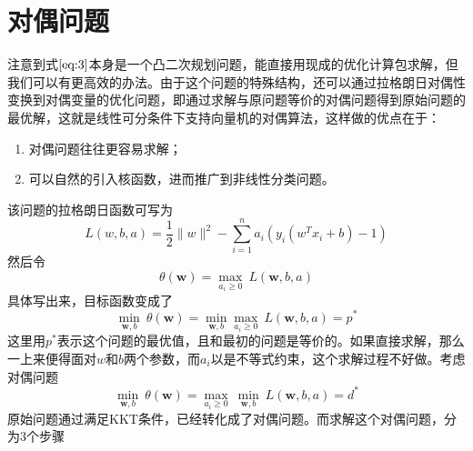 \section{对偶问题}
注意到式$\ref{eq:3}$本身是一个凸二次规划问题，能直接用现成的优化计算包求解，但我们可以有更高效的办法。由于这个问题的特殊结构，还可以通过拉格朗日对偶性变换到对偶变量的优化问题，即通过求解与原问题等价的对偶问题得到原始问题的最优解，这就是线性可分条件下支持向量机的对偶算法，这样做的优点在于：
\begin{enumerate}
	\item 对偶问题往往更容易求解；
	\item 可以自然的引入核函数，进而推广到非线性分类问题。	
\end{enumerate}
该问题的拉格朗日函数可写为
\begin{equation}
	L(w,b,a) = \frac{1}{2}\lVert w \rVert^2 - \sum_{i=1}^na_i (y_i(w^T x_i + b) - 1)
\end{equation}
然后令
\begin{equation}
	\theta (\boldsymbol{w}) = \mathop{max} \limits_{a_i \geq 0}\ L(\boldsymbol{w},b,a)
\end{equation}
具体写出来，目标函数变成了
\begin{equation}
	\mathop{min}\limits_{\boldsymbol{w},b}\ \theta(\boldsymbol{w}) = \mathop{min}\limits_{\boldsymbol{w},b}\mathop{ max}\limits_{a_i \geq 0}\ L(\boldsymbol{w},b,a) = p^*
\end{equation}
这里用$p^*$表示这个问题的最优值，且和最初的问题是等价的。如果直接求解，那么一上来便得面对$w$和$b$两个参数，而$a_i$以是不等式约束，这个求解过程不好做。考虑对偶问题
\begin{equation}
		\mathop{min}\limits_{\boldsymbol{w},b}\ \theta(\boldsymbol{w}) = \mathop{ max}\limits_{a_i \geq 0}\ \mathop{min}\limits_{\boldsymbol{w},b}\ L(\boldsymbol{w},b,a) = d^*
\end{equation}
原始问题通过满足KKT条件，已经转化成了对偶问题。而求解这个对偶问题，分为3个步骤
